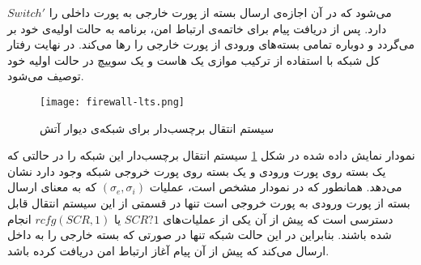 $Switch'$
می‌شود که در آن اجازه‌ی ارسال بسته از پورت خارجی به پورت داخلی را دارد.
پس از دریافت پیام برای خاتمه‌ی ارتباط امن، برنامه به حالت اولیه‌ی خود بر می‌گردد و دوباره تمامی بسته‌های ورودی از پورت خارجی را رها می‌کند.
در نهایت رفتار کل شبکه با استفاده از ترکیب موازی یک هاست و یک سوییچ در حالت اولیه خود توصیف می‌شود.
\begin{figure}[ht]
    \centerline{\texttt{[image: firewall-lts.png]}}
    \caption{سیستم انتقال برچسب‌دار برای شبکه‌ی دیوار آتش}
    \label{fig:dynetkat:lts}
\end{figure}
نمودار نمایش داده شده در شکل
\ref{fig:dynetkat:lts}
سیستم انتقال برچسب‌دار
این شبکه‌ را در حالتی که یک بسته روی پورت ورودی و یک بسته روی پورت خروجی شبکه وجود دارد نشان می‌دهد.
همانطور که در نمودار مشخص است، عملیات
$(\sigma_e,\sigma_i)$
که به معنای ارسال بسته از پورت ورودی به پورت خروجی است تنها در قسمتی از این سیستم انتقال قابل دسترسی است که پیش از آن یکی از عملیات‌های
$SCR?1$
یا
$rcfg(SCR,1)$
انجام شده باشند.
بنابراین در این حالت شبکه تنها در صورتی که بسته خارجی را به داخل ارسال می‌کند که پیش از آن پیام آغاز ارتباط امن دریافت کرده‌ باشد.

